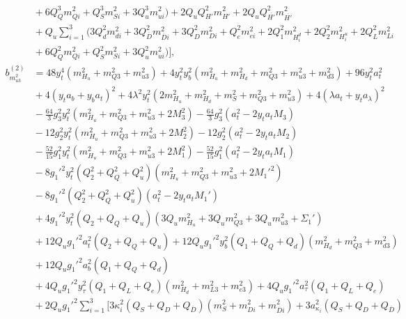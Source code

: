 \documentclass[preprint,amsmath,amssymb,aps,superscriptaddress,prd,showpacs,floatfix,nofootinbib]{revtex4-1}
\begin{document}
\begin{subequations}
\begin{align}
&{}+6Q_Q^3m_{Qi}^2+Q_S^3m_{Si}^2+3Q_u^3m_{ui}^2\big )+2Q_uQ_{H'}^2m_{H'}^2+2Q_uQ_{\overline{H'}}^2m_{\overline{H'}}^2\nonumber\\
&{}+Q_u\sum_{i=1}^3\big ( 3Q_d^2m_{di}^2+3Q_{\overline{D}}^2m_{\overline{D}i}^2+3Q_D^2m_{Di}^2+Q_e^2m_{ei}^2+2Q_1^2m_{H_i^d}^2+2Q_2^2m_{H_i^u}^2+2Q_L^2m_{Li}^2\nonumber\\
&{}+6Q_Q^2m_{Qi}^2+Q_S^2m_{Si}^2+3Q_u^2m_{ui}^2\big )\bigg ],\label{eq:USSMmu222BetaTwoLoop}\\
b_{m_{u3}^2}^{(2)}&=48y_t^4\left ( m_{H_u}^2+m_{Q3}^2+m_{u3}^2 \right )+4y_t^2y_b^2\left ( m_{H_u}^2+m_{H_d}^2+m_{Q3}^2+m_{u3}^2+m_{d3}^2 \right )+96y_t^2a_t^2\nonumber\\
&{}+4\left ( y_ta_b+y_ba_t\right )^2+4\lambda^2y_t^2\left ( 2m_{H_u}^2+m_{H_d}^2+m_S^2+m_{Q3}^2+m_{u3}^2 \right )+4\left ( \lambda a_t+y_ta_\lambda\right )^2\nonumber\\
&{}-\frac{64}{3}g_3^2y_t^2\left ( m_{H_u}^2+m_{Q3}^2+m_{u3}^2+2M_3^2\right )-\frac{64}{3}g_3^2\left ( a_t^2-2y_ta_tM_3 \right )\nonumber\\
&{}-12g_2^2y_t^2\left ( m_{H_u}^2+m_{Q3}^2+m_{u3}^2+2M_2^2\right )-12g_2^2\left ( a_t^2-2y_ta_tM_2\right )\nonumber\\
&{}-\frac{52}{15}g_1^2y_t^2\left ( m_{H_u}^2+m_{Q3}^2+m_{u3}^2+2M_1^2\right )-\frac{52}{15}g_1^2\left ( a_t^2-2y_ta_tM_1\right )\nonumber\\
&{}-8g_1'^2y_t^2\left ( Q_2^2+Q_Q^2+Q_u^2\right )\left ( m_{H_u}^2+m_{Q3}^2+m_{u3}^2+2M_1'^2\right )\nonumber\\
&{}-8g_1'^2\left ( Q_2^2+Q_Q^2+Q_u^2\right )\left ( a_t^2-2y_ta_tM_1'\right )\nonumber\\
&{}+4g_1'^2y_t^2\left ( Q_2+Q_Q+Q_u\right )\left ( 3Q_um_{H_u}^2+3Q_um_{Q3}^2+3Q_um_{u3}^2+\Sigma_1'\right )\nonumber\\
&{}+12Q_ug_1'^2a_t^2\left ( Q_2+Q_Q+Q_u\right )+12Q_ug_1'^2y_b^2\left ( Q_1+Q_Q+Q_d \right )\left ( m_{H_d}^2+m_{Q3}^2+m_{d3}^2\right )\nonumber\\
&{}+12Q_ug_1'^2a_b^2\left ( Q_1+Q_Q+Q_d \right )\nonumber\\
&{}+4Q_ug_1'^2y_\tau^2\left ( Q_1+Q_L+Q_e\right )\left ( m_{H_d}^2+m_{L3}^2+m_{e3}^2\right )+4Q_ug_1'^2a_\tau^2\left ( Q_1+Q_L+Q_e\right )\nonumber\\
&{}+2Q_ug_1'^2\sum_{i=1}^3\bigg [ 3\kappa_i^2\left ( Q_S+Q_D+Q_{\overline{D}}\right )\left ( m_S^2+m_{Di}^2+m_{\overline{D}i}^2\right )+3a_{\kappa_i}^2\left ( Q_S+Q_D+Q_{\overline{D}}\right )\nonumber\\

\end{align}
\end{subequations}
\end{document}
